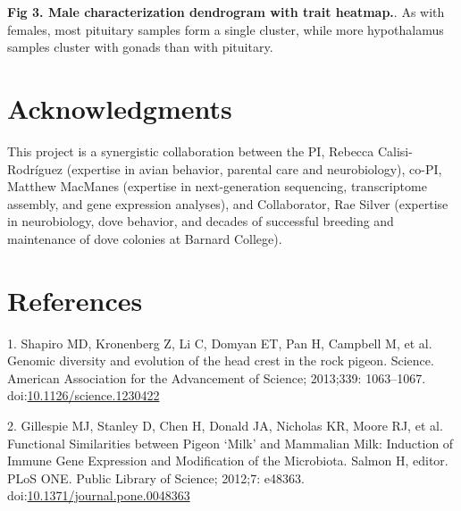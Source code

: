 \documentclass[10pt,letterpaper]{article}
\begin{document}
\textbf{Fig 3. Male characterization dendrogram with trait heatmap.}. As
with females, most pituitary samples form a single cluster, while more
hypothalamus samples cluster with gonads than with pituitary.

\hypertarget{acknowledgments}{%
\section{Acknowledgments}\label{acknowledgments}}

This project is a synergistic collaboration between the PI, Rebecca
Calisi-Rodríguez (expertise in avian behavior, parental care and
neurobiology), co-PI, Matthew MacManes (expertise in next-generation
sequencing, transcriptome assembly, and gene expression analyses), and
Collaborator, Rae Silver (expertise in neurobiology, dove behavior, and
decades of successful breeding and maintenance of dove colonies at
Barnard College).

\hypertarget{references}{%
\section*{References}\label{references}}

\hypertarget{refs}{}
\leavevmode\hypertarget{ref-Shapiro1063}{}%
1. Shapiro MD, Kronenberg Z, Li C, Domyan ET, Pan H, Campbell M, et al.
Genomic diversity and evolution of the head crest in the rock pigeon.
Science. American Association for the Advancement of Science; 2013;339:
1063--1067.
doi:\href{https://doi.org/10.1126/science.1230422}{10.1126/science.1230422}

\leavevmode\hypertarget{ref-Gillespie2012}{}%
2. Gillespie MJ, Stanley D, Chen H, Donald JA, Nicholas KR, Moore RJ, et
al. Functional Similarities between Pigeon `Milk' and Mammalian Milk:
Induction of Immune Gene Expression and Modification of the Microbiota.
Salmon H, editor. PLoS ONE. Public Library of Science; 2012;7: e48363.
doi:\href{https://doi.org/10.1371/journal.pone.0048363}{10.1371/journal.pone.0048363}

\nolinenumbers
\end{document}
